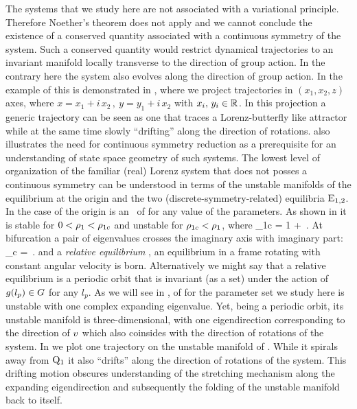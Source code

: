 The systems that we study here are not associated with a variational principle. Therefore
Noether's theorem does not apply and we  cannot conclude the existence of a conserved quantity associated
with a continuous symmetry of the system. Such a conserved quantity would restrict dynamical
trajectories to an invariant manifold locally transverse to the direction of group action.
In the contrary here the system also evolves along the direction of group action. In the example of {\CLe}
this is demonstrated in , where we project trajectories in $(x_1,x_2,z)$ axes, 
where $x=x_1+ i\, x_2\,,\ y=y_1+i\, x_2$ with $x_i,\,y_i\in\mathbb{R}^{}$. In this projection a generic 
trajectory can be seen as one that traces a Lorenz-butterfly like attractor while at the same time slowly
``drifting'' along the direction of rotations.  also illustrates the need for continuous symmetry 
reduction as a prerequisite for an understanding of state space geometry of such systems. 
The lowest level of organization of the familiar (real) Lorenz system that does not posses a continuous symmetry
can be understood in terms of the unstable manifolds of the equilibrium at the origin 
and the two (discrete-symmetry-related) equilibria $\mathrm{E}_{1,2}$. In the case of {\CLe}  the origin  
is an \eqv\ of  for any
value of the parameters. As shown in  it
is stable for $0<\rho_1<\rho_{1c}$ and unstable for
$\rho_{1c}<\rho_1$, where
\beq
	\rho_{1c} = 1 + \,.
\eeq
At bifurcation a pair of eigenvalues crosses the imaginary axis with imaginary part:
\beq
	\omega_c = \,.
	\label{eq:omegaCLE}
\eeq
and a \emph{relative equilibrium} , an equilibrium in a frame rotating with constant angular velocity
is born. Alternatively we might say that a relative equilibrium is a periodic orbit that is invariant (as a set)
under the action of $g(l_p)\in G$ for any $l_p$.
  As we will see in ,  of {\CLe} for 
the parameter set we study here is unstable with one complex expanding eigenvalue. Yet, being a periodic
orbit, its unstable manifold is three-dimensional, with one eigendirection corresponding
to the direction of $v$ which also coinsides with the direction of rotations of the system. 
In  we plot one trajectory on the unstable manifold of . While it spirals away
from $\mathrm{Q}_{1}$ it also ``drifts'' along the direction of rotations of the system. This drifting motion obscures 
understanding of the stretching mechanism along the expanding eigendirection and subsequently the folding of the
unstable manifold back to itself.

